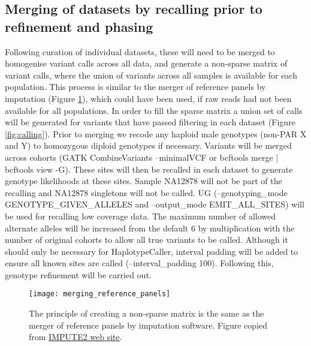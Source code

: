 \subsection{Merging of datasets by recalling prior to refinement and phasing}
Following curation of individual datasets, these will need to be merged to homogenise variant calls across all data, and generate a non-sparse matrix of variant calls, where the union of variants across all samples is available for each population. This process is similar to the merger of reference panels by imputation (Figure \ref{fig:merging_reference_panels}), which could have been used, if raw reads had not been available for all populations. In order to fill the sparse matrix a union set of calls will be generated for variants that have passed filtering in each dataset (Figure \ref{fig:calling}). Prior to merging we recode any haploid male genotypes (non-PAR X and Y) to homozygous diploid genotypes if necessary. %
Variants will be merged across cohorts (GATK CombineVariants --minimalVCF or bcftools merge | bcftools view -G). These sites will then be recalled in each dataset to generate genotype likelihoods at these sites. Sample NA12878 will not be part of the recalling and NA12878 singletons will not be called.
UG (--genotyping\_mode GENOTYPE\_GIVEN\_ALLELES and --output\_mode EMIT\_ALL\_SITES) will be used for recalling low coverage data.
The maximum number of allowed alternate alleles will be increased from the default 6 by multiplication with the number of original cohorts to allow all true variants to be called. Although it should only be necessary for HaplotypeCaller, interval padding will be added to ensure all known sites are called (--interval\_padding 100).
Following this, genotype refinement will be carried out.

\begin{figure}[!htbp]
\centering
\texttt{[image: merging\_reference\_panels]}
\caption{The principle of creating a non-sparse matrix is the same as the merger of reference panels by imputation software. Figure copied from \href{http://mathgen.stats.ox.ac.uk/impute/merging\_reference\_panels.png}{IMPUTE2 web site}.}
\label{fig:merging_reference_panels}
\end{figure}